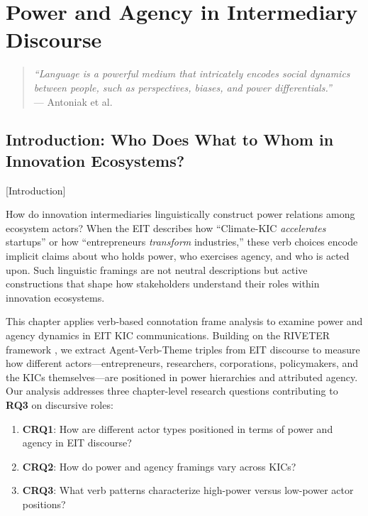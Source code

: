 \documentclass[../main.tex]{subfiles}
\begin{document}
\chapter{Power and Agency in Intermediary Discourse}
\margintoc

\begin{quote}
\textit{``Language is a powerful medium that intricately encodes social dynamics between people, such as perspectives, biases, and power differentials.''}\\
--- Antoniak et al. \cite{antoniak2023riveter}
\end{quote}

\section{Introduction: Who Does What to Whom in Innovation Ecosystems?}[Introduction]

How do innovation intermediaries linguistically construct power relations among ecosystem actors? When the EIT describes how ``Climate-KIC \textit{accelerates} startups'' or how ``entrepreneurs \textit{transform} industries,'' these verb choices encode implicit claims about who holds power, who exercises agency, and who is acted upon. Such linguistic framings are not neutral descriptions but active constructions that shape how stakeholders understand their roles within innovation ecosystems.

This chapter applies verb-based connotation frame analysis to examine power and agency dynamics in EIT KIC communications. Building on the RIVETER framework \cite{antoniak2023riveter}, we extract Agent-Verb-Theme triples from EIT discourse to measure how different actors---entrepreneurs, researchers, corporations, policymakers, and the KICs themselves---are positioned in power hierarchies and attributed agency. Our analysis addresses three chapter-level research questions contributing to \textbf{RQ3} on discursive roles:

\begin{enumerate}
    \item \textbf{CRQ1}: How are different actor types positioned in terms of power and agency in EIT discourse?
    \item \textbf{CRQ2}: How do power and agency framings vary across KICs?
    \item \textbf{CRQ3}: What verb patterns characterize high-power versus low-power actor positions?
\end{enumerate}
\end{document}
